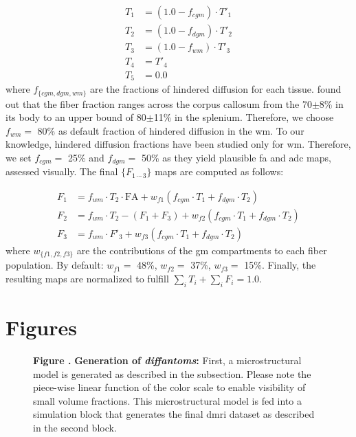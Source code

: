 \documentclass[english]{frontiers/frontiersSCNS} %
\begin{document}
  \begin{align*}
  T_1 &= (1.0-f_{cgm}) \cdot T'_1 \\
  T_2 &= (1.0-f_{dgm}) \cdot T'_2 \\
  T_3 &= (1.0-f_{wm}) \cdot T'_3 \\
  T_4 &= T'_4 \\
  T_5 &= 0.0
  \end{align*}
where $f_{\{cgm, dgm, wm\}}$ are the fractions of hindered diffusion for each tissue.
\cite{sepehrband_brain_2015} found out that the fiber fraction ranges across the corpus
  callosum from the 70$\pm$8\% in its body to an upper bound of 80$\pm$11\% in the splenium.
Therefore, we choose $f_{wm} =$ 80\% as default fraction of hindered diffusion in the
  \gls*{wm}.
To our knowledge, hindered diffusion fractions have been studied only for \gls*{wm}.
Therefore, we set $f_{cgm} =$ 25\% and $f_{dgm} =$ 50\% as they yield plausible \gls*{fa}
  and \gls*{adc} maps, assessed visually.
The final $\{F_{1\,\cdots\,3}\}$ maps are computed as follows:

\begin{align*}
F_1 &= f_{wm} \cdot T_2 \cdot \text{FA} + w_{f1} (f_{cgm} \cdot T_1 + f_{dgm} \cdot T_2) \\
F_2 &= f_{wm} \cdot T_2 - (F_1 + F_3) + w_{f2} (f_{cgm} \cdot T_1 + f_{dgm} \cdot T_2) \\
F_3 &= f_{wm} \cdot F'_3 + w_{f3} (f_{cgm} \cdot T_1 + f_{dgm} \cdot T_2)
\end{align*}
where $w_{\{f1, f2, f3\}}$ are the contributions of the \gls*{gm} compartments to each fiber population.
By default: $w_{f1} = $ 48\%, $w_{f2} = $ 37\%, $w_{f3} = $ 15\%.
Finally, the resulting maps are normalized to fulfill $\sum_i T_i + \sum_i F_i = 1.0$.

\newpage
\section*{Figures}

\begin{figure}[h!]
\begin{center}

\end{center}
\textbf{\label{fig:figure1} Figure . }%
{\textbf{Generation of \emph{diffantoms}:} First, a microstructural model is generated as described
  in the  subsection.
Please note the piece-wise linear function of the color scale to enable visibility of small volume fractions.
This microstructural model is fed into a simulation block that generates the final \gls*{dmri} dataset
  as described in the second block.
}
\end{figure}
\end{document}
